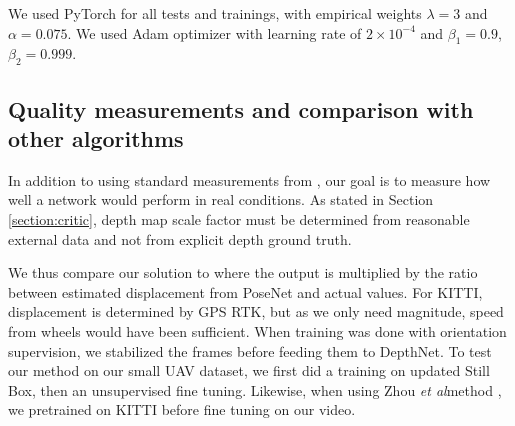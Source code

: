 \documentclass[runningheads]{llncs}
\def\etal{\emph{et al}\:}
\begin{document}
We used PyTorch \cite{paszke2017automatic} for all tests and trainings, with empirical weights $\lambda = 3$ and $\alpha = 0.075$. We used Adam optimizer \cite{DBLP:journals/corr/KingmaB14} with learning rate of
$2 \times 10^{-4}$
and $\beta_1 = 0.9$, $\beta_2 = 0.999$.

\subsection{Quality measurements and comparison with other algorithms}
In addition to
using
standard measurements from \cite{eigen2014depth}, our goal is to measure how well a network would perform in real conditions. As stated in Section \ref{section:critic}, depth map scale factor must be determined from reasonable external data and not from explicit depth ground truth.

We thus compare our solution to \cite{zhou2017unsupervised} where the output is multiplied by the ratio between estimated displacement from PoseNet and actual values. For KITTI, displacement is determined by GPS RTK, but as we only need magnitude, speed from wheels would have been sufficient. When training was done with orientation supervision, we stabilized the frames before feeding them to DepthNet.
To test our method on our small UAV dataset, we first did a training on updated Still Box, then an unsupervised fine tuning. Likewise, when using Zhou \etal method \cite{zhou2017unsupervised}, we pretrained on KITTI before fine tuning on our video.
\end{document}
